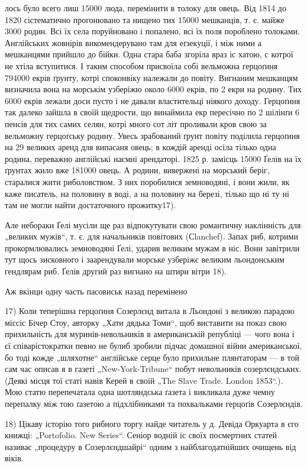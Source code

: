 лось було всего лиш 15000 люда, перемінити в толоку для овець. Від 1814 до 1820 сістематично
прогонювано та нищено тих 15000 мешканців, т. є. майже 3000 родин. Всі їх села поруйновано і
попалено, всі їх поля пороблено толоками. Англійських жовнірів викомендерувано там для еґзекуції, і
між ними а мешканцями прийшло до бійки. Одна
стара баба згоріла враз іс хатою, с котрої не хтіла вступитися. І таким способом присвоїла собі
вельможна герцоґиня 794000 екрів ґрунту, котрі споконвіку належали до
повіту. Вигнаним мешканцям визначила вона на морськім узберіжю около 6000 екрів, по 2 екри на
родину. Тих 6000 екрів лежали доси пусто і не давали властительці ніякого
доходу. Герцоґиня так далеко зайшла в своїй щедрости, що винаймила екр пересічно по 2 шілінґи 6
пенсів для тих самих селян, котрі много сот літ проливали кров свою за
вельможну герцоґську родину. Увесь зрабований ґрунт повіту поділила герцоґиня на 29 великих аренд
для випасаня овець; в кождій аренді осіла тілько одна родина, переважно англійські наємні
арендаторі. 1825 р. замісць 15000 Ґелів на їх ґрунтах жило вже 181000 овець. А родини, вивержені на
морський беріг, старалися жити риболовством. З них поробилися земноводяні, і вони жили, як каже
писатель, на половину в воді, а на половину на березі, тілько що ні ту ні там не могли найти
достаточного прожитку17).

Але небораки Ґелі мусіли ще раз відпокутувати свою романтичну наклінність для „великих мужів“, т. є.
для начальників повітових (Сlanchef). Запах риб, котрими прокормлювались земноводяні Ґелі, ударив
великим мужам в ніс. Вони завітрили тут щось зисковного і заарендували морське узберіжє великим
льондонським гендлярам риб. Ґелів другий раз вигнано на штири вітри 18).

Аж вкінци одну часть пасовиськ назад перемінено

17) Коли теперішна герцоґиня Созерлєнд витала в Льондоні з великою парадою міссіс Бічер Стоу,
авторку „Хати дядька Томи“, щоб виставити на показ свою прихильність для муринів-невольників в
американській републіці — чого вона і єї співарістократки певно не булиб зробили підчас домашної
війни американської, бо тоді кожде „шляхотне“ англійське серце було прихильне плянтаторам — в той
сам час описав
я в газеті „New-York-Tribune“ побут невольників созерлєндських. (Деякі місця тої статі навів Керей в
своїй „The Slave Trade. London 1853“.). Мою статю перепечатала одна шотляндська ґазета і викликала
дуже чемну перепалку між тою ґазетою а підхлібниками та похвальками герцоґів Созерлєндів.

18) Цікаву історію того рибного торгу найде читатель у д. Девіда Оркуарта в єго книжці: „Portofolio.
New Series“. Сеніор водній іс своїх посмертних статей називає „процедуру в Созерлєндшайрі“ одним з
найблагодатнійших очищень від віків.

